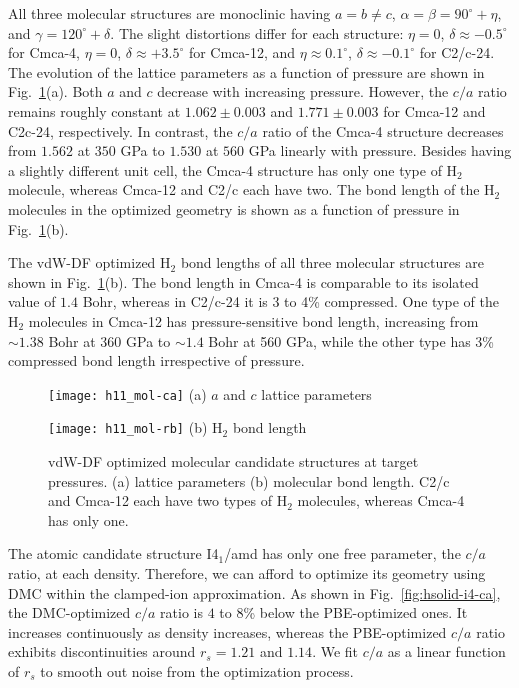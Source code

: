 All three molecular structures are monoclinic having $a=b\neq c$, $\alpha=\beta=90^\circ+\eta$, and $\gamma=120^\circ+\delta$. The slight distortions differ for each structure: $\eta=0$, $\delta\approx -0.5^\circ$ for Cmca-4, $\eta=0$, $\delta\approx+3.5^\circ$ for Cmca-12, and $\eta\approx0.1^\circ$, $\delta\approx-0.1^\circ$ for C2/c-24.
The evolution of the lattice parameters as a function of pressure are shown in Fig.~\ref{fig:hsolid-vdw-ca}(a).
Both $a$ and $c$ decrease with increasing pressure.
However, the $c/a$ ratio remains roughly constant at $1.062\pm0.003$ and $1.771\pm0.003$ for Cmca-12 and C2c-24, respectively.
In contrast, the $c/a$ ratio of the Cmca-4 structure decreases from $1.562$ at $350$ GPa to $1.530$ at $560$ GPa linearly with pressure.
Besides having a slightly different unit cell, the Cmca-4 structure has only one type of H$_2$ molecule, whereas Cmca-12 and C2/c each have two.
The bond length of the H$_2$ molecules in the optimized geometry is shown as a function of pressure in Fig.~\ref{fig:hsolid-vdw-ca}(b).

The vdW-DF optimized H$_2$ bond lengths of all three molecular structures are shown in Fig.~\ref{fig:hsolid-vdw-ca}(b).
The bond length in Cmca-4 is comparable to its isolated value of $1.4$ Bohr, whereas in C2/c-24 it is 3 to 4\% compressed.
One type of the H$_2$ molecules in Cmca-12 has pressure-sensitive bond length, increasing from $\sim 1.38$ Bohr at 360 GPa to $\sim 1.4$ Bohr at 560 GPa, while the other type has 3\% compressed bond length irrespective of pressure.

\begin{figure}[h]
\centering
\begin{minipage}{0.49\textwidth}
\centering
\texttt{[image: h11\_mol-ca]}
(a) $a$ and $c$ lattice parameters
\end{minipage}
\begin{minipage}{0.49\textwidth}
\centering
\texttt{[image: h11\_mol-rb]}
(b) H$_2$ bond length
\end{minipage}
\caption{vdW-DF optimized molecular candidate structures at target pressures. (a) lattice parameters (b) molecular bond length. C2/c and Cmca-12 each have two types of H$_2$ molecules, whereas Cmca-4 has only one.}
\label{fig:hsolid-vdw-ca}
\end{figure}

The atomic candidate structure I4$_1$/amd has only one free parameter, the $c/a$ ratio, at each density.
Therefore, we can afford to optimize its geometry using DMC within the clamped-ion approximation.
As shown in Fig.~\ref{fig:hsolid-i4-ca}, the DMC-optimized $c/a$ ratio is $4$ to $8$\% below the PBE-optimized ones.
It increases continuously as density increases, whereas the PBE-optimized $c/a$ ratio exhibits discontinuities around $r_s=1.21$ and $1.14$.
We fit $c/a$ as a linear function of $r_s$ to smooth out noise from the optimization process.

